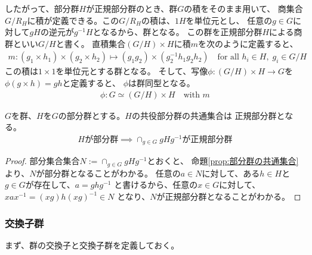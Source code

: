 {	したがって、部分群$H$が正規部分群のとき、群$G$の積をそのまま用いて、
	商集合$G/R_H$に積が定義できる。この$G/R_H$の積は、$1H$を単位元とし、
	任意の$g\in G$に対して$gH$の逆元が$g^{-1}H$となるから、群となる。
	この群を正規部分群$H$による商群といい$G/H$と書く。
	直積集合$(G/H)\times H$に積$m$を次のように定義すると、
	\begin{equation*}\begin{split}
		m: (g_1\times h_1)\times(g_2\times h_2) 
		\mapsto (g_1g_2)\times(g_2^{-1}h_1g_2h_2)
		\quad\text{for all }h_i\in H,\; g_i\in G/H
	\end{split}\end{equation*}
	この積は$1\times1$を単位元とする群となる。
	そして、写像$\phi:(G/H)\times H\to G$を$\phi(g\times h)=gh$と定義すると、
	$\phi$は群同型となる。
	\begin{equation*}\begin{split}
		\phi: G\simeq (G/H)\times H \quad\text{with } m
	\end{split}\end{equation*}


	\begin{proposition}[共役部分群の共通集合]\label{prop:共役部分群の共通集合} %
		$G$を群、$H$を$G$の部分群とする。$H$の共役部分群の共通集合は
		正規部分群となる。
		\begin{equation*}\begin{split}
			\text{$H$が部分群} \implies \cap_{g\in G} gHg^{-1}\text{が正規部分群} 
		\end{split}\end{equation*}
	\end{proposition} %
	\begin{proof} %
		部分集合集合$N:=\cap_{g\in G} gHg^{-1}$とおくと、
		命題\ref{prop:部分群の共通集合}より、$N$が部分群となることがわかる。
		任意の$a\in N$に対して、ある$h\in H$と$g\in G$が存在して、$a=ghg^{-1}$
		と書けるから、任意の$x\in G$に対して、$xax^{-1}=(xg)h(xg)^{-1}\in N$
		となり、$N$が正規部分群となることがわかる。
	\end{proof} %
\subsubsection{交換子群}\label{s3:交換子群} %
	まず、群の交換子と交換子群を定義しておく。

}
